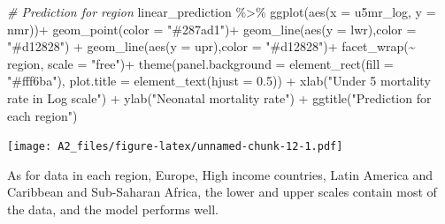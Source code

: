 \documentclass[
]{article}
\newenvironment{Shaded}{\begin{snugshade}}{\end{snugshade}}
\newcommand{\AttributeTok}[1]{\textcolor[rgb]{0.77,0.63,0.00}{#1}}
\newcommand{\CommentTok}[1]{\textcolor[rgb]{0.56,0.35,0.01}{\textit{#1}}}
\newcommand{\FloatTok}[1]{\textcolor[rgb]{0.00,0.00,0.81}{#1}}
\newcommand{\FunctionTok}[1]{\textcolor[rgb]{0.00,0.00,0.00}{#1}}
\newcommand{\NormalTok}[1]{#1}
\newcommand{\SpecialCharTok}[1]{\textcolor[rgb]{0.00,0.00,0.00}{#1}}
\newcommand{\StringTok}[1]{\textcolor[rgb]{0.31,0.60,0.02}{#1}}
\begin{document}
\begin{Shaded}
\begin{Highlighting}[]
\CommentTok{\#  Prediction for region}
\NormalTok{linear\_prediction }\SpecialCharTok{\%\textgreater{}\%}
  \FunctionTok{ggplot}\NormalTok{(}\FunctionTok{aes}\NormalTok{(}\AttributeTok{x =}\NormalTok{ u5mr\_log, }\AttributeTok{y =}\NormalTok{ nmr))}\SpecialCharTok{+}
  \FunctionTok{geom\_point}\NormalTok{(}\AttributeTok{color =} \StringTok{"\#287ad1"}\NormalTok{)}\SpecialCharTok{+}
  \FunctionTok{geom\_line}\NormalTok{(}\FunctionTok{aes}\NormalTok{(}\AttributeTok{y =}\NormalTok{ lwr),}\AttributeTok{color =} \StringTok{"\#d12828"}\NormalTok{) }\SpecialCharTok{+}
  \FunctionTok{geom\_line}\NormalTok{(}\FunctionTok{aes}\NormalTok{(}\AttributeTok{y =}\NormalTok{ upr),}\AttributeTok{color =} \StringTok{"\#d12828"}\NormalTok{)}\SpecialCharTok{+}
  \FunctionTok{facet\_wrap}\NormalTok{(}\SpecialCharTok{\textasciitilde{}}\NormalTok{ region, }\AttributeTok{scale =} \StringTok{"free"}\NormalTok{)}\SpecialCharTok{+}
  \FunctionTok{theme}\NormalTok{(}\AttributeTok{panel.background =} \FunctionTok{element\_rect}\NormalTok{(}\AttributeTok{fill =} \StringTok{"\#fff6ba"}\NormalTok{),}
        \AttributeTok{plot.title =} \FunctionTok{element\_text}\NormalTok{(}\AttributeTok{hjust =} \FloatTok{0.5}\NormalTok{)) }\SpecialCharTok{+}
  \FunctionTok{xlab}\NormalTok{(}\StringTok{"Under 5 mortality rate in Log scale"}\NormalTok{) }\SpecialCharTok{+}
  \FunctionTok{ylab}\NormalTok{(}\StringTok{"Neonatal mortality rate"}\NormalTok{) }\SpecialCharTok{+}
  \FunctionTok{ggtitle}\NormalTok{(}\StringTok{"Prediction for each region"}\NormalTok{)}
\end{Highlighting}
\end{Shaded}

\texttt{[image: A2\_files/figure-latex/unnamed-chunk-12-1.pdf]}

As for data in each region, Europe, High income countries, Latin America
and Caribbean and Sub-Saharan Africa, the lower and upper scales contain
most of the data, and the model performs well.
\end{document}
